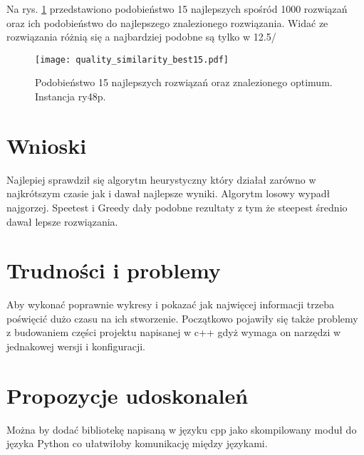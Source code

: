 \documentclass{article}
\begin{document}
Na rys. \ref{fig:quality_sim} przedstawiono podobieństwo 15 najlepszych spośród 1000 rozwiązań oraz ich podobieństwo do najlepszego znalezionego rozwiązania. Widać ze rozwiązania różnią się a najbardziej podobne są tylko w 12.5/%


\begin{figure}[H]
    \begin{center}
        \texttt{[image: quality\_similarity\_best15.pdf]}
    \end{center}
    \caption{Podobieństwo 15 najlepszych rozwiązań oraz znalezionego optimum. Instancja ry48p.}
    \label{fig:quality_sim}
\end{figure}

\section{Wnioski}

Najlepiej sprawdził się algorytm heurystyczny który działał zarówno w najkrótszym czasie jak i dawał najlepsze wyniki. Algorytm losowy wypadł najgorzej. Speetest i Greedy dały podobne rezultaty z tym że steepest średnio dawał lepsze rozwiązania.

\section{Trudności i problemy}

Aby wykonać poprawnie wykresy i pokazać jak najwięcej informacji trzeba poświęcić dużo czasu na ich stworzenie. Początkowo pojawiły się także problemy z budowaniem części projektu napisanej w c++ gdyż wymaga on narzędzi w jednakowej wersji i konfiguracji.

\section{Propozycje udoskonaleń}

Można by dodać bibliotekę napisaną w języku cpp jako skompilowany moduł do języka Python co ułatwiłoby komunikację między językami.

\clearpage



\end{document}
